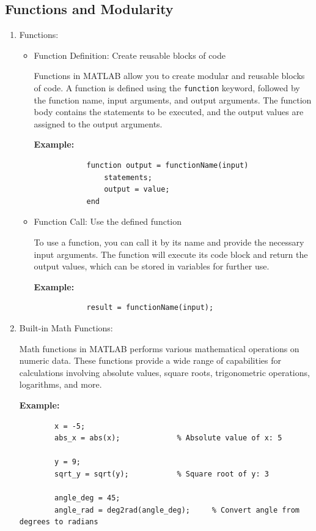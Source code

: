 \documentclass[
11pt, %
a4paper, %
oneside, %
headinclude,footinclude, %
BCOR5mm, %
]{scrartcl}
\begin{document}
\subsection{Functions and Modularity}
\begin{enumerate}
	\item Functions:
	\begin{itemize}
		\item Function Definition: Create reusable blocks of code
		
		Functions in MATLAB allow you to create modular and reusable blocks of code. A function is defined using the \texttt{function} keyword, followed by the function name, input arguments, and output arguments. The function body contains the statements to be executed, and the output values are assigned to the output arguments.
		
		\textbf{Example:}
		\begin{verbatim}
			function output = functionName(input)
			    statements;
			    output = value;
			end
		\end{verbatim}
		
		\item Function Call: Use the defined function
		
		To use a function, you can call it by its name and provide the necessary input arguments. The function will execute its code block and return the output values, which can be stored in variables for further use.
		
		\textbf{Example:}
		\begin{verbatim}
			result = functionName(input);
		\end{verbatim}
	\end{itemize}
	
	\item Built-in Math Functions:
	
	Math functions in MATLAB performs various mathematical operations on numeric data. These functions provide a wide range of capabilities for calculations involving absolute values, square roots, trigonometric operations, logarithms, and more.
	
	\textbf{Example:}
	\begin{verbatim}
		x = -5;
		abs_x = abs(x);             % Absolute value of x: 5
		
		y = 9;
		sqrt_y = sqrt(y);           % Square root of y: 3
		
		angle_deg = 45;
		angle_rad = deg2rad(angle_deg);     % Convert angle from degrees to radians
		

\end{verbatim}
\end{enumerate}
\end{document}
